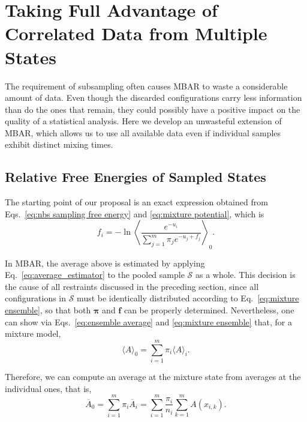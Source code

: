 \documentclass[aip,jcp,reprint,amsmath,amssymb]{revtex4-1}
\newcommand{\vt}[1]{\boldsymbol{\mathbf{#1}}}           %
\begin{document}
\section{Taking Full Advantage of Correlated Data from Multiple States}

The requirement of subsampling often causes MBAR to waste a considerable amount of data. Even though the discarded configurations carry less information than do the ones that remain, they could possibly have a positive impact on the quality of a statistical analysis. Here we develop an unwasteful extension of MBAR, which allows us to use all available data even if individual samples exhibit distinct mixing times.

\subsection{Relative Free Energies of Sampled States}

The starting point of our proposal is an exact expression obtained from Eqs.~\eqref{eq:nbs sampling free energy} and \eqref{eq:mixture potential}, which is
\begin{equation}
\label{eq:free energy exact}
f_i = -\ln \left\langle \frac{e^{-u_i}}{\sum_{j=1}^m \pi_j e^{-u_j + f_j}} \right\rangle_0.
\end{equation}

In MBAR, the average above is estimated by applying Eq.~\eqref{eq:average_estimator} to the pooled sample $\mathcal S$ as a whole. This decision is the cause of all restraints discussed in the preceding section, since all configurations in $\mathcal S$ must be identically distributed according to Eq.~\eqref{eq:mixture ensemble}, so that both $\vt \pi$ and $\vt f$ can be properly determined. Nevertheless, one can show via Eqs.~\eqref{eq:ensemble average} and \eqref{eq:mixture ensemble} that, for a mixture model,
\begin{equation}
\label{eq:mixture average}
\langle A \rangle_0 = \sum_{i=1}^m \pi_i \langle A \rangle_i.
\end{equation}

Therefore, we can compute an average at the mixture state from averages at the individual ones, that is,
\begin{equation}
\label{eq:mixture average estimator}
{\overline A}_0 = \sum_{i=1}^m \pi_i \overline{A}_i = \sum_{i=1}^m \frac{\pi_i}{n_i} \sum_{k=1}^m A(x_{i,k}).
\end{equation}
\end{document}
